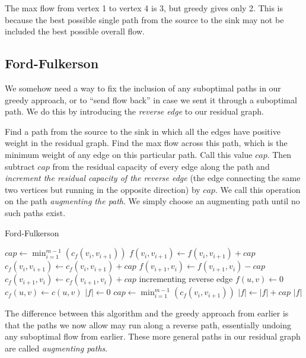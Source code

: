 \documentclass[11pt]{book}
\begin{document}
The max flow from vertex 1 to vertex 4 is 3, but greedy gives only 2. This is because the best possible single path from the source to the sink may not be included the best possible overall flow.

\subsection{Ford-Fulkerson}

We somehow need a way to fix the inclusion of any suboptimal paths in our greedy approach, or to ``send flow back'' in case we sent it through a suboptimal path. We do this by introducing the \textit{reverse edge} to our residual graph.

Find a path from the source to the sink in which all the edges have positive weight in the residual graph. Find the max flow across this path, which is the minimum weight of any edge on this particular path. Call this value $cap$. Then subtract $cap$ from the residual capacity of every edge along the path and \textit{increment the residual capacity of the reverse edge} (the edge connecting the same two vertices but running in the opposite direction) by $cap$. We call this operation on the path \textit{augmenting the path}. We simply choose an augmenting path until no such paths exist.

\begin{algorithm}[H]
\caption{Ford-Fulkerson}
\begin{algorithmic}
\State $cap \gets \min_{i=1}^{m-1}(c_f(v_i,v_{i+1}))$
	\State $f(v_i,v_{i+1}) \gets f(v_i,v_{i+1}) + cap$
	\State $c_f(v_i,v_{i+1}) \gets c_f(v_i,v_{i+1}) + cap$
	\State $f(v_{i+1},v_i) \gets f(v_{i+1},v_i) - cap$
	\State $c_f(v_{i+1},v_i) \gets c_f(v_{i+1},v_i) + cap$
	\Comment incrementing reverse edge
\EndFor
\EndFunction
{}
		\State $f(u,v) \gets 0$
		\State $c_f(u,v) \gets c(u,v)$
	\EndFor
	\State $|f| \gets 0$
		\State $cap \gets \min_{i=1}^{m-1}(c_f(v_i,v_{i+1}))$
		\State $|f| \gets |f| + cap$
		\State {}
	\EndWhile
	\Return $|f|$
\EndFunction
\end{algorithmic}
\end{algorithm}

The difference between this algorithm and the greedy approach from earlier is that the paths we now allow may run along a reverse path, essentially undoing any suboptimal flow from earlier. These more general paths in our residual graph are called \textit{augmenting paths}.
\end{document}
